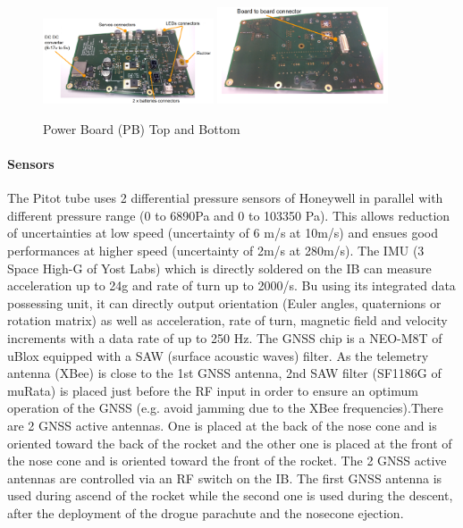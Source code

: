   \begin{figure}[h!]
 	\centering
        \includegraphics[width=0.45\textwidth]{img/AV_FIG_PB_top.PNG}
          \includegraphics[width=0.45\textwidth]{img/AV_FIG_PB_bottom.PNG}
        \caption{Power Board (PB) Top and Bottom}
        \label{f:avionics_pb}
 \end{figure}

\paragraph{Sensors}
The Pitot tube uses 2 differential pressure sensors of Honeywell in parallel with different pressure range (0 to 6890Pa and 0 to 103350 Pa). This allows reduction of uncertainties at low speed (uncertainty of 6 m/s at 10m/s) and ensues good performances at higher speed (uncertainty of 2m/s at 280m/s). The IMU (3 Space High-G of Yost Labs) which is directly soldered on the IB can measure acceleration up to 24g and rate of turn up to 2000/s. Bu using its integrated data possessing unit, it can directly output orientation (Euler angles, quaternions or rotation matrix) as well as acceleration, rate of turn, magnetic field and velocity increments with a data rate of up to 250 Hz.
The GNSS chip is a NEO-M8T of uBlox equipped with a SAW (surface acoustic waves) filter. As the telemetry antenna (XBee) is close to the 1st GNSS antenna, 2nd SAW filter (SF1186G of muRata) is placed just before the RF input in order to ensure an optimum operation of the GNSS (e.g. avoid jamming due to the XBee frequencies).There are 2 GNSS active antennas. One is placed at the back of the nose cone and is oriented toward the back of the rocket and the other one is placed at the front of the nose cone and is oriented toward the front of the rocket. The 2 GNSS active antennas are controlled via an RF switch on the IB. The first GNSS antenna is used during ascend of the rocket while the second one is used during the descent, after the deployment of the drogue parachute and the nosecone ejection.

